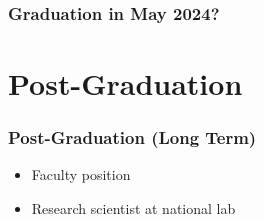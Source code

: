 \documentclass{beamer}
\begin{document}
%
%
%
%
%
%
%
%
%

\begin{frame}
\frametitle{Graduation in May 2024?}
\end{frame}

\section{Post-Graduation}

\begin{frame}
\frametitle{Post-Graduation (Long Term)}

  \begin{itemize}
    \item
      Faculty position
    \item
      Research scientist at national lab
  \end{itemize}

\end{frame}
\end{document}
